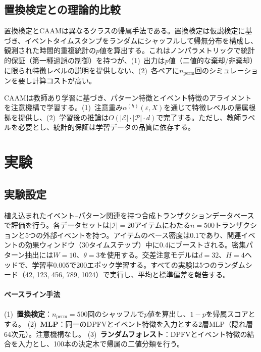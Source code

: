 \documentclass[sigconf,nonacm]{acmart}
\begin{document}
\subsection{置換検定との理論的比較}
\label{sec:theoretical_comparison}

置換検定とCAAMは異なるクラスの帰属手法である。置換検定は仮説検定に基づき、イベントタイムスタンプをランダムにシャッフルして帰無分布を構成し、観測された時間的重複統計の$p$値を算出する。これはノンパラメトリックで統計的保証（第一種過誤の制御）を持つが、(1)~出力は$p$値（二値的な棄却/非棄却）に限られ特徴レベルの説明を提供しない、(2)~各ペアに$n_{\text{perm}}$回のシミュレーションを要し計算コストが高い。

CAAMは教師あり学習に基づき、パターン特徴とイベント特徴のアライメントを注意機構で学習する。(1)~注意重み$\alpha^{(h)}(\varepsilon, X)$を通じて特徴レベルの帰属根拠を提供し、(2)~学習後の推論は$O(|\mathcal{E}| \cdot |\mathcal{P}| \cdot d)$で完了する。ただし、教師ラベルを必要とし、統計的保証は学習データの品質に依存する。

\section{実験}
\label{sec:experiments}

\subsection{実験設定}

植え込まれたイベント--パターン関連を持つ合成トランザクションデータベースで評価を行う。各データセットは$|\mathcal{I}| = 20$アイテムにわたる$n = 500$トランザクションと5つの外部イベントを持つ。アイテムのベース密度は0.1であり、関連イベントの効果ウィンドウ（30タイムステップ）中に0.4にブーストされる。密集パターン抽出には$W = 10$、$\theta = 3$を使用する。交差注意モデルは$d = 32$、$H = 4$ヘッドで、学習率0.005で200エポック学習する。すべての実験は5つのランダムシード（42, 123, 456, 789, 1024）で実行し、平均と標準偏差を報告する。

\paragraph{ベースライン手法}
(1)~\textbf{置換検定}：$n_{\text{perm}} = 500$回のシャッフルで$p$値を算出し、$1 - p$を帰属スコアとする。
(2)~\textbf{MLP}：同一のDPFVとイベント特徴を入力とする2層MLP（隠れ層64次元）。注意機構なし。
(3)~\textbf{ランダムフォレスト}：DPFVとイベント特徴の結合を入力とし、100本の決定木で帰属の二値分類を行う。
\end{document}
